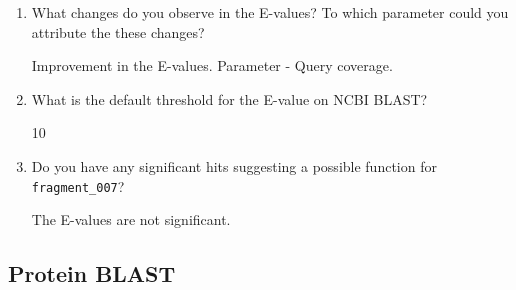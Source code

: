 \documentclass[a4paper,11pt]{article}
\begin{document}
\begin{enumerate}
\item What changes do you observe in the E-values? To which parameter could you attribute the these changes?  

Improvement in the E-values. Parameter - Query coverage.

\item What is the default threshold for the E-value on NCBI BLAST?

10

\item Do you have any significant hits suggesting a possible function for \texttt{fragment\_007}? 

The E-values are not significant. 

\end{enumerate}

\subsection{Protein BLAST}
\end{document}
